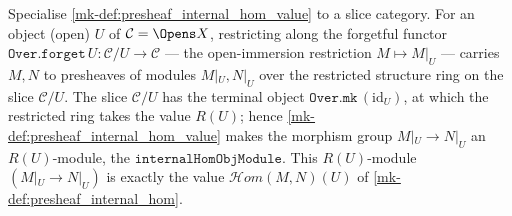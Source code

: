\begin{definition}\label{mk-def:presheaf_internal_hom_slice_value}
  \leanok

  Specialise \ref{mk-def:presheaf_internal_hom_value} to a slice category. For an object
  (open) \(U\) of \(\mathcal{C} = \Opens X\), restricting along the forgetful functor
  \(\mathtt{Over.forget}\,U : \mathcal{C}/U \to \mathcal{C}\) --- the open-immersion
  restriction \(M \mapsto M|_U\) --- carries \(M, N\) to presheaves of modules
  \(M|_U, N|_U\) over the restricted structure ring on the slice \(\mathcal{C}/U\). The
  slice \(\mathcal{C}/U\) has the terminal object \(\mathtt{Over.mk}\,(\mathrm{id}_U)\),
  at which the restricted ring takes the value \(R(U)\); hence
  \ref{mk-def:presheaf_internal_hom_value} makes the morphism group
  \(M|_U \longrightarrow N|_U\) an \(R(U)\)-module, the
  \(\mathtt{internalHomObjModule}\). This \(R(U)\)-module \((M|_U \to N|_U)\) is exactly
  the value \(\mathcal{H}om(M, N)(U)\) of \ref{mk-def:presheaf_internal_hom}.
\end{definition}

